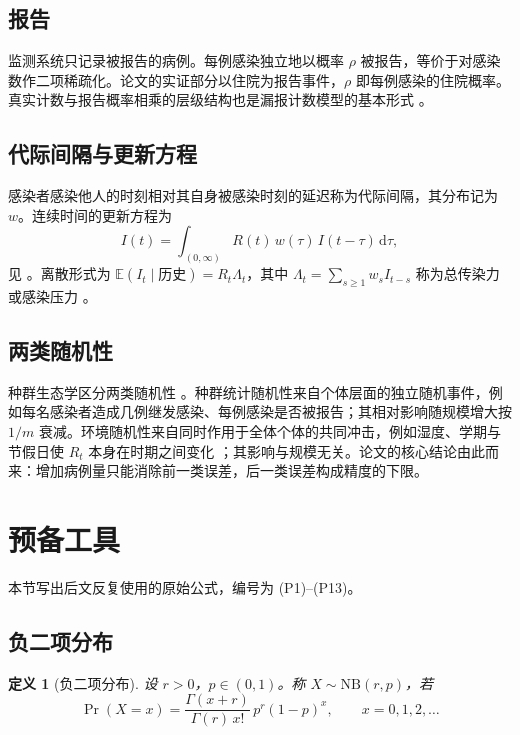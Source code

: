 \documentclass[fontset=none,11pt,a4paper,fleqn]{ctexart}
\numberwithin{equation}{section}
\theoremstyle{zhthm}
\newtheorem{definition}{定义}[section]
\theoremstyle{zhrem}
\newcommand{\E}{\mathbb{E}}
\newcommand{\NB}{\mathrm{NB}}
\begin{document}
\subsection{报告}

监测系统只记录被报告的病例。每例感染独立地以概率 $\rho$ 被报告，等价于对感染数作二项稀疏化。论文的实证部分以住院为报告事件，$\rho$ 即每例感染的住院概率。真实计数与报告概率相乘的层级结构也是漏报计数模型的基本形式 \citep[Sec.~2.2]{stoner2019hierarchical}。

\subsection{代际间隔与更新方程}

感染者感染他人的时刻相对其自身被感染时刻的延迟称为代际间隔，其分布记为 $w$。连续时间的更新方程为
\begin{equation*}
I(t)=\int_{\,(0,\infty)} R(t)\,w(\tau)\,I(t-\tau)\,\mathrm d\tau ,
\end{equation*}
见 \citet[式 (1)、(6)]{fraser2007estimating}。离散形式为 $\E(I_t\mid\text{历史})=R_t\Lambda_t$，其中 $\Lambda_t=\sum_{s\ge1}w_sI_{t-s}$ 称为总传染力或感染压力 \citep[Materials and Methods 第 3、6 段]{cori2013new}。

\subsection{两类随机性}

种群生态学区分两类随机性 \citep{engen1998demographic,lande2003stochastic}。种群统计随机性来自个体层面的独立随机事件，例如每名感染者造成几例继发感染、每例感染是否被报告；其相对影响随规模增大按 $1/m$ 衰减。环境随机性来自同时作用于全体个体的共同冲击，例如湿度、学期与节假日使 $R_t$ 本身在时期之间变化 \citep[引言]{dalziel2018urbanization}；其影响与规模无关。论文的核心结论由此而来：增加病例量只能消除前一类误差，后一类误差构成精度的下限。

\section{预备工具}\label{sec:tools}

本节写出后文反复使用的原始公式，编号为 (P1)--(P13)。

\subsection{负二项分布}

\begin{definition}[负二项分布]\label{def:nb}
设 $r>0$，$p\in(0,1)$。称 $X\sim\NB(r,p)$，若
\begin{equation*}
\Pr(X=x)=\frac{\Gamma(x+r)}{\Gamma(r)\,x!}\,p^{r}(1-p)^{x},\qquad x=0,1,2,\dots
\end{equation*}
\end{definition}
\end{document}
